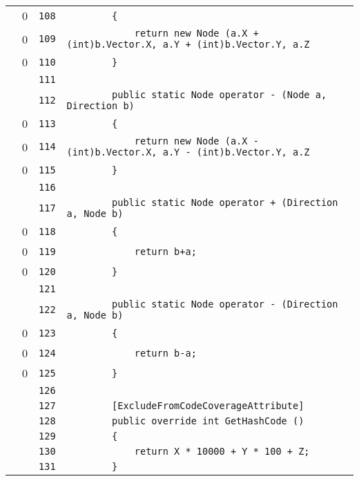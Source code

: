 \documentclass[a4paper,10pt]{article}
\begin{document}
\begin{longtable}[l]{lrrl}
\cellcolor{red} & 0 & \verb~108~ & \verb~        {~\\
\cellcolor{red} & 0 & \verb~109~ & \verb~            return new Node (a.X + (int)b.Vector.X, a.Y + (int)b.Vector.Y, a.Z~\\
\cellcolor{red} & 0 & \verb~110~ & \verb~        }~\\
\cellcolor{gray} &  & \verb~111~ & \verb~~\\
\cellcolor{gray} &  & \verb~112~ & \verb~        public static Node operator - (Node a, Direction b)~\\
\cellcolor{red} & 0 & \verb~113~ & \verb~        {~\\
\cellcolor{red} & 0 & \verb~114~ & \verb~            return new Node (a.X - (int)b.Vector.X, a.Y - (int)b.Vector.Y, a.Z~\\
\cellcolor{red} & 0 & \verb~115~ & \verb~        }~\\
\cellcolor{gray} &  & \verb~116~ & \verb~~\\
\cellcolor{gray} &  & \verb~117~ & \verb~        public static Node operator + (Direction a, Node b)~\\
\cellcolor{red} & 0 & \verb~118~ & \verb~        {~\\
\cellcolor{red} & 0 & \verb~119~ & \verb~            return b+a;~\\
\cellcolor{red} & 0 & \verb~120~ & \verb~        }~\\
\cellcolor{gray} &  & \verb~121~ & \verb~~\\
\cellcolor{gray} &  & \verb~122~ & \verb~        public static Node operator - (Direction a, Node b)~\\
\cellcolor{red} & 0 & \verb~123~ & \verb~        {~\\
\cellcolor{red} & 0 & \verb~124~ & \verb~            return b-a;~\\
\cellcolor{red} & 0 & \verb~125~ & \verb~        }~\\
\cellcolor{gray} &  & \verb~126~ & \verb~~\\
\cellcolor{gray} &  & \verb~127~ & \verb~        [ExcludeFromCodeCoverageAttribute]~\\
\cellcolor{gray} &  & \verb~128~ & \verb~        public override int GetHashCode ()~\\
\cellcolor{gray} &  & \verb~129~ & \verb~        {~\\
\cellcolor{gray} &  & \verb~130~ & \verb~            return X * 10000 + Y * 100 + Z;~\\
\cellcolor{gray} &  & \verb~131~ & \verb~        }~\\

\end{longtable}
\end{document}
